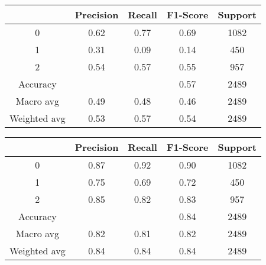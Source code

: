 \documentclass{article}
\begin{document}
\vspace{-0.4cm} %
\begin{table*}[htbp]
  \centering

  \begin{minipage}{0.45\textwidth}
    \centering
    \caption{Result of Model Evaluation of NB}
    \label{tab:table2}
    {\footnotesize
    \begin{tabular}{|c|c|c|c|c|}
      \hline
      & Precision & Recall & F1-Score & Support \\ \hline
      0 & 0.62 & 0.77 & 0.69 & 1082 \\ \hline
      1 & 0.31 & 0.09 & 0.14 & 450 \\ \hline
      2 & 0.54 & 0.57 & 0.55 & 957 \\ \hline
      Accuracy & \multicolumn{2}{c|}{} & 0.57 & 2489 \\ \hline
      Macro avg & 0.49 & 0.48 & 0.46 & 2489 \\ \hline
      Weighted avg & 0.53 & 0.57 & 0.54 & 2489 \\ \hline
    \end{tabular}
    }
  \end{minipage}\hfill
  \begin{minipage}{0.45\textwidth}
    \centering
    \caption{Result of Model Evaluation of KNN}
    \label{tab:table3}
    {\footnotesize
    \begin{tabular}{|c|c|c|c|c|}
      \hline
      & Precision & Recall & F1-Score & Support \\ \hline
      0 & 0.87 & 0.92 & 0.90 & 1082 \\ \hline
      1 & 0.75 & 0.69 & 0.72 & 450 \\ \hline
      2 & 0.85 & 0.82 & 0.83 & 957 \\ \hline
      Accuracy & \multicolumn{2}{c|}{} & 0.84 & 2489 \\ \hline
      Macro avg & 0.82 & 0.81 & 0.82 & 2489 \\ \hline
      Weighted avg & 0.84 & 0.84 & 0.84 & 2489 \\ \hline
    \end{tabular}
    }
  \end{minipage}
\end{table*}
\vspace{0.005cm}
\end{document}
